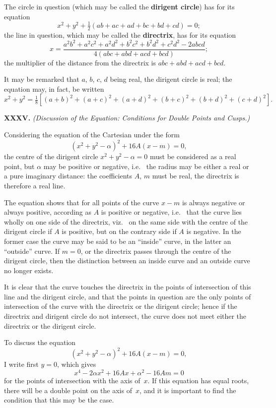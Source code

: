 \documentclass[12pt,a4paper]{article}
\theoremstyle{definition}
\newcommand{\viz}{viz.\ }
\newcommand{\ie}{i.e.\ }
\begin{document}
The circle in question (which may be called the \textbf{dirigent circle})
has for its equation
\[
x^{2} + y^{2} + \tfrac{1}{2}(ab + ac + ad + bc + bd + cd) = 0;
\]
the line in question, which may be called the \textbf{directrix}, has for its
equation
\[
x = \frac{a^{2}b^{2} + a^{2}c^{2} + a^{2}d^{2} + b^{2}c^{2} + b^{2}d^{2} + c^{2}d^{2} - 2abcd}
{4(abc + abd + acd + bcd)};
\]
the multiplier of the distance from the directrix is
$abc + abd + acd + bcd$.

It may be remarked that $a$, $b$, $c$, $d$ being real, the dirigent
circle is real; the equation may, in fact, be written
\[
x^{2} + y^{2} = \tfrac{1}{8} [ (a + b)^{2} + (a + c)^{2} + (a + d)^{2}
+ (b + c)^{2} + (b + d)^{2} + (c + d)^{2} ].
\]

\medskip\noindent\textbf{XXXV.}
\textit{(Discussion of the Equation: Conditions for Double Points and Cusps.)}

Considering the equation of the Cartesian under the form
\[
(x^{2} + y^{2} - \alpha)^{2} + 16A(x - m) = 0,
\]
the centre of the dirigent circle $x^{2} + y^{2} - \alpha = 0$ must
be considered as a real point, but $\alpha$ may be positive or negative,
\ie{} the radius may be either a real or a pure imaginary distance:
the coefficients $A$, $m$ must be real, the directrix is therefore
a real line.

The equation shows that for all points of the curve $x - m$
is always negative or always positive, according as $A$ is
positive or negative, \ie{} that the curve lies wholly on one side
of the directrix, \viz{} on the same side with the centre of
the dirigent circle if $A$ is positive, but on the contrary side
if $A$ is negative. In the former case the curve may be said
to be an ``inside'' curve, in the latter an ``outside'' curve.
If $m = 0$, or the directrix passes through the centre of the
dirigent circle, then the distinction between an inside curve
and an outside curve no longer exists.

It is clear that the curve touches the directrix in the points
of intersection of this line and the dirigent circle, and that
the points in question are the only points of intersection of
the curve with the directrix or the dirigent circle; hence if
the directrix and dirigent circle do not intersect, the curve
does not meet either the directrix or the dirigent circle.

To discuss the equation
\[
(x^{2} + y^{2} - \alpha)^{2} + 16A(x - m) = 0,
\]
I write first $y = 0$, which gives
\[
x^{4} - 2\alpha x^{2} + 16Ax + \alpha^{2} - 16Am = 0
\]
for the points of intersection with the axis of~$x$.
If this equation has equal roots, there will be a double point
on the axis of~$x$, and it is important to find the condition
that this may be the case.
\end{document}
